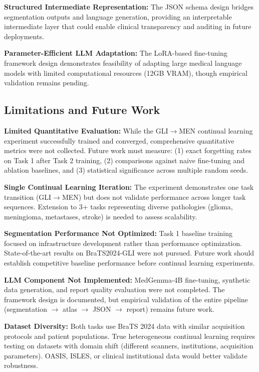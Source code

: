 \documentclass[conference]{IEEEtran}
\begin{document}
\textbf{Structured Intermediate Representation:} The JSON schema design bridges segmentation outputs and language generation, providing an interpretable intermediate layer that could enable clinical transparency and auditing in future deployments.

\textbf{Parameter-Efficient LLM Adaptation:} The LoRA-based fine-tuning framework design demonstrates feasibility of adapting large medical language models with limited computational resources (12GB VRAM), though empirical validation remains pending.

\subsection{Limitations and Future Work}

\textbf{Limited Quantitative Evaluation:} While the GLI$\to$MEN continual learning experiment successfully trained and converged, comprehensive quantitative metrics were not collected. Future work must measure: (1) exact forgetting rates on Task 1 after Task 2 training, (2) comparisons against naive fine-tuning and ablation baselines, and (3) statistical significance across multiple random seeds.

\textbf{Single Continual Learning Iteration:} The experiment demonstrates one task transition (GLI$\to$MEN) but does not validate performance across longer task sequences. Extension to 3+ tasks representing diverse pathologies (glioma, meningioma, metastases, stroke) is needed to assess scalability.

\textbf{Segmentation Performance Not Optimized:} Task 1 baseline training focused on infrastructure development rather than performance optimization. State-of-the-art results on BraTS2024-GLI were not pursued. Future work should establish competitive baseline performance before continual learning experiments.

\textbf{LLM Component Not Implemented:} MedGemma-4B fine-tuning, synthetic data generation, and report quality evaluation were not completed. The framework design is documented, but empirical validation of the entire pipeline (segmentation $\to$ atlas $\to$ JSON $\to$ report) remains future work.

\textbf{Dataset Diversity:} Both tasks use BraTS 2024 data with similar acquisition protocols and patient populations. True heterogeneous continual learning requires testing on datasets with domain shift (different scanners, institutions, acquisition parameters). OASIS, ISLES, or clinical institutional data would better validate robustness.
\end{document}
